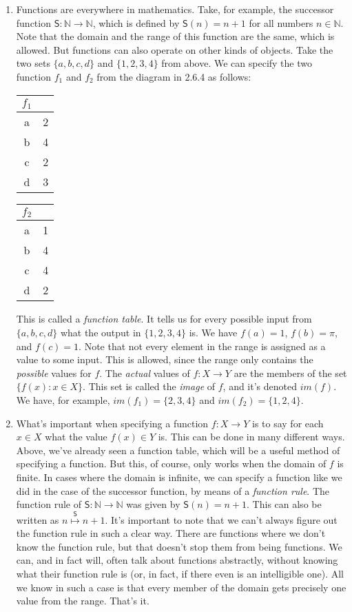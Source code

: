 \begin{enumerate}[\thesection.1]
\item Functions are everywhere in mathematics. Take, for example, the successor function $\mathsf{S}:\mathbb{N}\to \mathbb{N}$, which is defined by $\mathsf{S}(n)=n+1$ for all numbers $n\in\mathbb{N}$. Note that the domain and the range of this function are the same, which is allowed. But functions can also operate on other kinds of objects. Take the two sets $\{a,b,c,d\}$ and $\{1,2,3,4\}$ from above. We can specify the two function $f_1$ and $f_2$ from the diagram in 2.6.4 as follows:
	\begin{center}
		\begin{tabular}{c | c}
		$f_1$ &  \\
		\hline
		a & 2\\
		b & 4\\
		c & 2\\
		d & 3
		\end{tabular}
		\hspace{8ex}
			\begin{tabular}{c | c}
		$f_2$ &  \\
		\hline
		a & 1\\
		b & 4\\
		c & 4\\
		d & 2
		\end{tabular}
	\end{center}
This is called a \emph{function table}. It tells us for every possible input from $\{a,b,c,d\}$ what the output in $\{1,2,3,4\}$ is. We have $f(a)=1$, $f(b)=\pi$, and $f(c)=1$. Note that not every element in the range is assigned as a value to some input. This is allowed, since the range only contains the \emph{possible} values for $f$. The \emph{actual} values of $f:X\to Y$ are the members of the set $\{f(x): x\in X\}$. This set is called the \emph{image} of $f$, and it's denoted $im(f)$. We have, for example, $im(f_1)=\{2,3,4\}$ and $im(f_2)=\{1,2,4\}$.

\item What's important when specifying a function $f:X\to Y$ is to say for each $x\in X$ what the value $f(x)\in Y$ is. This can be done in many different ways. Above, we've already seen a function table, which will be a useful method of specifying a function. But this, of course, only works when the domain of $f$ is finite. In cases where the domain is infinite, we can specify a function like we did in the case of the successor function, by means of a \emph{function rule}. The function rule of $\mathsf{S}:\mathbb{N}\to \mathbb{N}$ was given by $\mathsf{S}(n)=n+1$. This can also be written as $n\overset{\mathsf{S}}{\mapsto}n+1$. It's important to note that we can't always figure out the function rule in such a clear way. There are functions where we don't know the function rule, but that doesn't stop them from being functions. We can, and in fact will, often talk about functions abstractly, without knowing what their function rule is (or, in fact, if there even is an intelligible one). All we know in such a case is that every member of the domain gets precisely one value from the range. That's it.


\end{enumerate}
